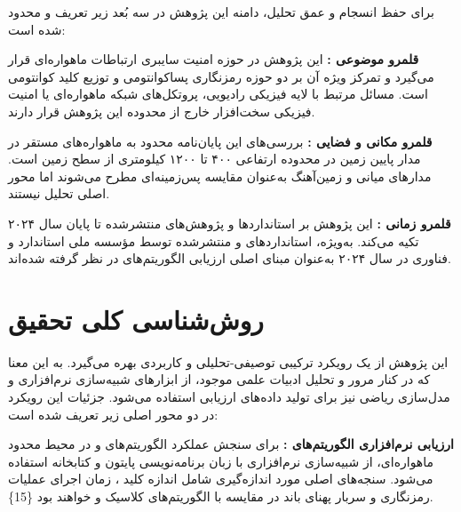 \documentclass[a4paper,14pt]{extreport}
\begin{document}
برای حفظ انسجام و عمق تحلیل، دامنه این پژوهش در سه بُعد زیر تعریف و محدود شده است:

\textbf{قلمرو موضوعی :} این پژوهش در حوزه امنیت سایبری  ارتباطات ماهواره‌ای قرار می‌گیرد و تمرکز ویژه آن بر دو حوزه رمزنگاری پساکوانتومی  و توزیع کلید کوانتومی  است. مسائل مرتبط با لایه فیزیکی رادیویی، پروتکل‌های شبکه ماهواره‌ای یا امنیت فیزیکی سخت‌افزار خارج از محدوده این پژوهش قرار دارند.

\textbf{قلمرو مکانی و فضایی :} بررسی‌های این پایان‌نامه محدود به ماهواره‌های مستقر در مدار پایین زمین  در محدوده ارتفاعی ۴۰۰ تا ۱۲۰۰ کیلومتری از سطح زمین است. مدارهای میانی  و زمین‌آهنگ  به‌عنوان مقایسه پس‌زمینه‌ای مطرح می‌شوند اما محور اصلی تحلیل نیستند.

\textbf{قلمرو زمانی :} این پژوهش بر استانداردها و پژوهش‌های منتشرشده تا پایان سال ۲۰۲۴ تکیه می‌کند. به‌ویژه، استانداردهای  و  منتشرشده توسط مؤسسه ملی استاندارد و فناوری  در سال ۲۰۲۴ به‌عنوان مبنای اصلی ارزیابی الگوریتم‌های  در نظر گرفته شده‌اند.

\section{روش‌شناسی کلی تحقیق}

این پژوهش از یک رویکرد ترکیبی توصیفی-تحلیلی و کاربردی  بهره می‌گیرد. به این معنا که در کنار مرور و تحلیل ادبیات علمی موجود، از ابزارهای شبیه‌سازی نرم‌افزاری و مدل‌سازی ریاضی نیز برای تولید داده‌های ارزیابی استفاده می‌شود. جزئیات این رویکرد در دو محور اصلی زیر تعریف شده است:

\textbf{ارزیابی نرم‌افزاری الگوریتم‌های :} برای سنجش عملکرد الگوریتم‌های  و  در محیط محدود ماهواره‌ای، از شبیه‌سازی نرم‌افزاری  با زبان برنامه‌نویسی پایتون  و کتابخانه  استفاده می‌شود. سنجه‌های  اصلی مورد اندازه‌گیری شامل اندازه کلید ، زمان اجرای عملیات رمزنگاری  و سربار پهنای باند  در مقایسه با الگوریتم‌های کلاسیک  و  خواهند بود \{15\}.
\end{document}
